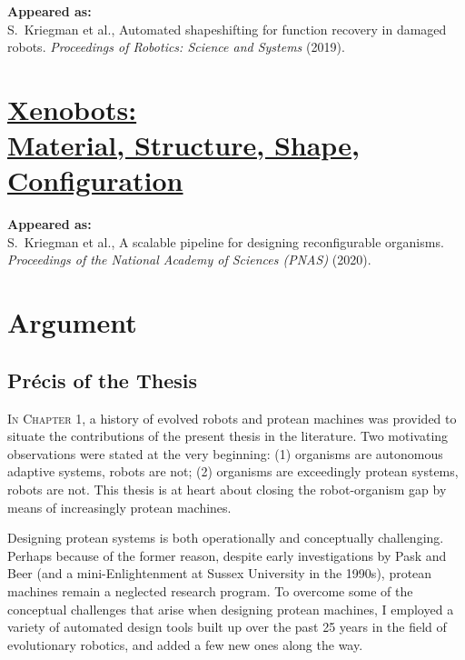 \textbf{Appeared as:}\\
S.~Kriegman et al., Automated shapeshifting for function recovery in damaged robots. \textit{Proceedings of Robotics: Science and Systems} (2019).


\chapter[Xenobots: Material, Structure, Shape, Configuration]{\href{https://www.pnas.org/content/117/4/1853}{\color{blue}Xenobots: \\ {\LARGE Material, Structure, Shape, Configuration}}}

\textbf{Appeared as:}\\
S.~Kriegman et al., A scalable pipeline for designing reconfigurable organisms. 
\textit{Proceedings of the National Academy of Sciences (PNAS)} (2020).





\chapter{Argument}


\section{Pr\'{e}cis of the Thesis}

\textsc{In Chapter 1,}
a history of 
evolved robots 
and protean machines was provided
to situate the contributions of the present thesis in the literature.
Two motivating observations were stated at the very beginning:
(1) organisms are autonomous adaptive systems, robots are not;
(2) organisms are exceedingly protean systems, robots are not.
This thesis is at heart about closing the robot-organism gap by means of increasingly protean machines.

Designing protean systems is both operationally and conceptually challenging.
Perhaps because of the former reason, despite early investigations by Pask and Beer (and a mini-Enlightenment at Sussex University in the 1990s), protean machines remain a neglected research program.
To overcome some of the conceptual challenges that arise when designing protean machines,
I employed a variety of automated design tools built up over the past 25 years in the field of evolutionary robotics, and added a few new ones along the way.


